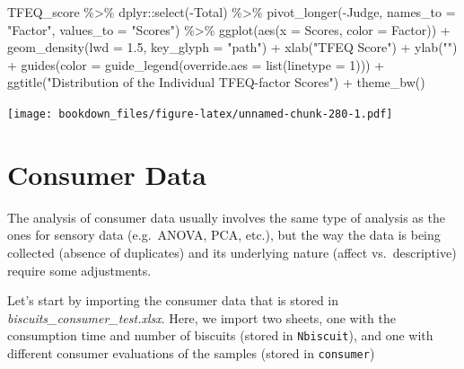 \documentclass[
]{krantz}
\makeatletter
\newenvironment{Shaded}{\begin{snugshade}}{\end{snugshade}}
\newcommand{\AttributeTok}[1]{\textcolor[rgb]{0.61,0.61,0.61}{#1}}
\newcommand{\DecValTok}[1]{\textcolor[rgb]{0.06,0.06,0.06}{#1}}
\newcommand{\FloatTok}[1]{\textcolor[rgb]{0.06,0.06,0.06}{#1}}
\newcommand{\FunctionTok}[1]{\textcolor[rgb]{0,0,0}{#1}}
\newcommand{\NormalTok}[1]{#1}
\newcommand{\SpecialCharTok}[1]{\textcolor[rgb]{0,0,0}{#1}}
\newcommand{\StringTok}[1]{\textcolor[rgb]{0.5,0.5,0.5}{#1}}
\newenvironment{kframe}{%
\medskip{}
\setlength{\fboxsep}{.8em}
 \def\at@end@of@kframe{}%
 \ifinner\ifhmode%
  \def\at@end@of@kframe{\end{minipage}}%
  \begin{minipage}{\columnwidth}%
 \fi\fi%
 \def\FrameCommand##1{\hskip\@totalleftmargin \hskip-\fboxsep
 \colorbox{shadecolor}{##1}\hskip-\fboxsep
     \hskip-\linewidth \hskip-\@totalleftmargin \hskip\columnwidth}%
 \MakeFramed {\advance\hsize-\width
   \@totalleftmargin\z@ \linewidth\hsize
   \@setminipage}}%
 {\par\unskip\endMakeFramed%
 \at@end@of@kframe}
\renewenvironment{Shaded}{\begin{kframe}}{\end{kframe}}
\makeatother
\begin{document}
\begin{Shaded}
\begin{Highlighting}[]
\NormalTok{TFEQ\_score }\SpecialCharTok{\%\textgreater{}\%}
\NormalTok{  dplyr}\SpecialCharTok{::}\FunctionTok{select}\NormalTok{(}\SpecialCharTok{{-}}\NormalTok{Total) }\SpecialCharTok{\%\textgreater{}\%}
  \FunctionTok{pivot\_longer}\NormalTok{(}\SpecialCharTok{{-}}\NormalTok{Judge, }\AttributeTok{names\_to =} \StringTok{"Factor"}\NormalTok{, }\AttributeTok{values\_to =} \StringTok{"Scores"}\NormalTok{) }\SpecialCharTok{\%\textgreater{}\%}
  \FunctionTok{ggplot}\NormalTok{(}\FunctionTok{aes}\NormalTok{(}\AttributeTok{x =}\NormalTok{ Scores, }\AttributeTok{color =}\NormalTok{ Factor)) }\SpecialCharTok{+}
  \FunctionTok{geom\_density}\NormalTok{(}\AttributeTok{lwd =} \FloatTok{1.5}\NormalTok{, }\AttributeTok{key\_glyph =} \StringTok{"path"}\NormalTok{) }\SpecialCharTok{+}
  \FunctionTok{xlab}\NormalTok{(}\StringTok{"TFEQ Score"}\NormalTok{) }\SpecialCharTok{+}
  \FunctionTok{ylab}\NormalTok{(}\StringTok{""}\NormalTok{) }\SpecialCharTok{+}
  \FunctionTok{guides}\NormalTok{(}\AttributeTok{color =} \FunctionTok{guide\_legend}\NormalTok{(}\AttributeTok{override.aes =} \FunctionTok{list}\NormalTok{(}\AttributeTok{linetype =} \DecValTok{1}\NormalTok{))) }\SpecialCharTok{+}
  \FunctionTok{ggtitle}\NormalTok{(}\StringTok{"Distribution of the Individual TFEQ{-}factor Scores"}\NormalTok{) }\SpecialCharTok{+}
  \FunctionTok{theme\_bw}\NormalTok{()}
\end{Highlighting}
\end{Shaded}

\texttt{[image: bookdown\_files/figure-latex/unnamed-chunk-280-1.pdf]}

\hypertarget{tibble-use}{%
\section{Consumer Data}\label{tibble-use}}

The analysis of consumer data usually involves the same type of analysis as the ones for sensory data (e.g.~ANOVA, PCA, etc.), but the way the data is being collected (absence of duplicates) and its underlying nature (affect vs.~descriptive) require some adjustments.

Let's start by importing the consumer data that is stored in \emph{biscuits\_consumer\_test.xlsx}. Here, we import two sheets, one with the consumption time and number of biscuits (stored in \texttt{Nbiscuit}), and one with different consumer evaluations of the samples (stored in \texttt{consumer})
\end{document}
